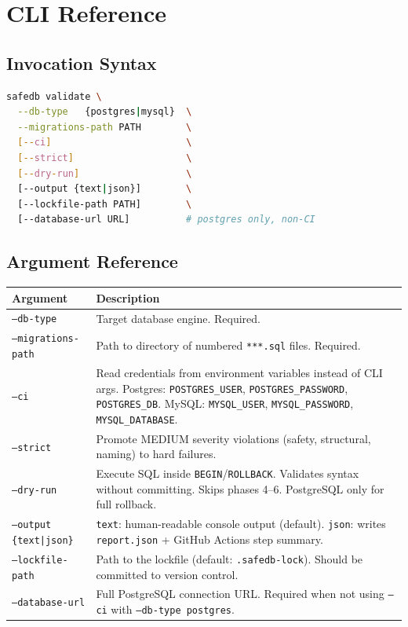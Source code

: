 \documentclass[12pt,a4paper]{report}
\begin{document}
\chapter{CLI Reference}

\section{Invocation Syntax}

\begin{lstlisting}[language=bash]
safedb validate \
  --db-type   {postgres|mysql}  \
  --migrations-path PATH        \
  [--ci]                        \
  [--strict]                    \
  [--dry-run]                   \
  [--output {text|json}]        \
  [--lockfile-path PATH]        \
  [--database-url URL]          # postgres only, non-CI
\end{lstlisting}

\section{Argument Reference}

\begin{longtable}{@{}p{3.8cm}p{9cm}@{}}
\toprule
\textbf{Argument} & \textbf{Description} \\
\midrule
\endhead
\texttt{--db-type} &
  Target database engine. Required. \\
\texttt{--migrations-path} &
  Path to directory of numbered \texttt{***.sql} files. Required. \\
\texttt{--ci} &
  Read credentials from environment variables instead of CLI args.
  Postgres: \texttt{POSTGRES\_USER}, \texttt{POSTGRES\_PASSWORD}, \texttt{POSTGRES\_DB}.
  MySQL: \texttt{MYSQL\_USER}, \texttt{MYSQL\_PASSWORD}, \texttt{MYSQL\_DATABASE}. \\
\texttt{--strict} &
  Promote MEDIUM severity violations (safety, structural, naming) to hard failures. \\
\texttt{--dry-run} &
  Execute SQL inside \texttt{BEGIN}/\texttt{ROLLBACK}. Validates syntax without
  committing. Skips phases 4–6. PostgreSQL only for full rollback. \\
\texttt{--output \{text|json\}} &
  \texttt{text}: human-readable console output (default).
  \texttt{json}: writes \texttt{report.json} + GitHub Actions step summary. \\
\texttt{--lockfile-path} &
  Path to the lockfile (default: \texttt{.safedb-lock}).
  Should be committed to version control. \\
\texttt{--database-url} &
  Full PostgreSQL connection URL. Required when not using \texttt{--ci}
  with \texttt{--db-type postgres}. \\
\bottomrule
\end{longtable}
\end{document}
